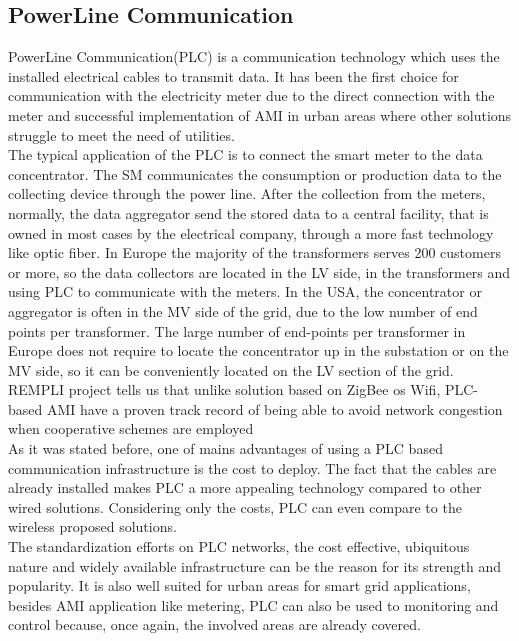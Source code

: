 \subsection{PowerLine Communication}
PowerLine Communication(PLC) is a communication technology which uses the installed electrical cables to transmit data. It has been the first choice for communication with the electricity meter due to the direct connection with the meter and successful implementation of AMI in urban areas where other solutions struggle to meet the need of utilities\cite{gungor2011smart}. \\
The typical application of the PLC is to connect the smart meter to the data concentrator. The SM communicates the consumption or production data to the collecting device through the power line. After the collection from the meters, normally, the data aggregator send the  stored data to a central facility, that is owned in most cases by the electrical company,  through a more fast technology like optic fiber. In Europe the majority of the transformers serves 200 customers or more, so the data collectors are located in the LV side, in the transformers and using PLC to communicate with the meters. In the USA, the concentrator or aggregator is often in the MV side of the grid, due to the low number of end points per transformer. The large number of end-points per transformer in Europe does not require to locate the concentrator up in the substation or on the MV side, so it can be conveniently located on the LV section of the grid. REMPLI project tells us that unlike solution based on ZigBee os Wifi, PLC-based AMI have a proven track record of being able to avoid network congestion when cooperative schemes are employed\cite{galli2011grid} \\
As it was stated before, one of mains advantages of using a PLC based communication infrastructure is the cost to deploy.  The fact that the cables are already installed makes PLC a more appealing technology compared to other wired solutions. Considering only the costs, PLC can even compare to the wireless proposed solutions\cite{gungor2011smart}. \\
The standardization efforts on PLC networks, the cost effective, ubiquitous nature and widely available infrastructure can be the reason for its strength and popularity. It is also well suited for urban areas for smart grid applications, besides AMI  application like metering, PLC can also be used to monitoring and control because, once again, the involved areas are already covered.\\
